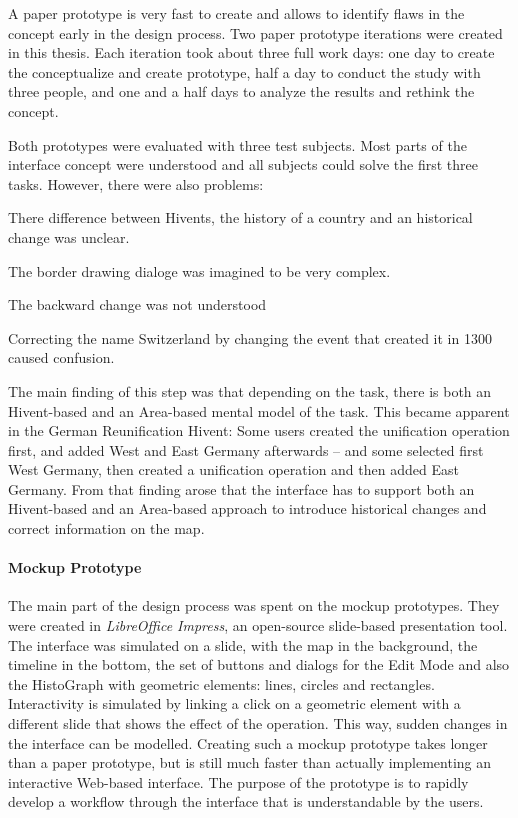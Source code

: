 A paper prototype is very fast to create and allows to identify flaws in the concept early in the design process. Two paper prototype iterations were created in this thesis. Each iteration took about three full work days: one day to create the conceptualize and create prototype, half a day to conduct the study with three people, and one and a half days to analyze the results and rethink the concept.

Both prototypes were evaluated with three test subjects. Most parts of the interface concept were understood and all subjects could solve the first three tasks. However, there were also problems:

\begin{compactenum}
  \item There difference between Hivents, the history of a country and an historical change was unclear.
  \item The border drawing dialoge was imagined to be very complex.
  \item The backward change was not understood
  \item Correcting the name Switzerland by changing the event that created it in 1300 caused confusion.
\end{compactenum}

The main finding of this step was that depending on the task, there is both an Hivent-based and an Area-based mental model of the task. This became apparent in the German Reunification Hivent: Some users created the unification operation first, and added West and East Germany afterwards -- and some selected first West Germany, then created a unification operation and then added East Germany. From that finding arose that the interface has to support both an Hivent-based and an Area-based approach to introduce historical changes and correct information on the map.


\paragraph{Mockup Prototype} %
\label{par:mockup_prototype}

The main part of the design process was spent on the mockup prototypes. They were created in \emph{LibreOffice Impress}, an open-source slide-based presentation tool. The interface was simulated on a slide, with the map in the background, the timeline in the bottom, the set of buttons and dialogs for the Edit Mode and also the HistoGraph with geometric elements: lines, circles and rectangles. Interactivity is simulated by linking a click on a geometric element with a different slide that shows the effect of the operation. This way, sudden changes in the interface can be modelled. Creating such a mockup prototype takes longer than a paper prototype, but is still much faster than actually implementing an interactive Web-based interface. The purpose of the prototype is to rapidly develop a workflow through the interface that is understandable by the users.

